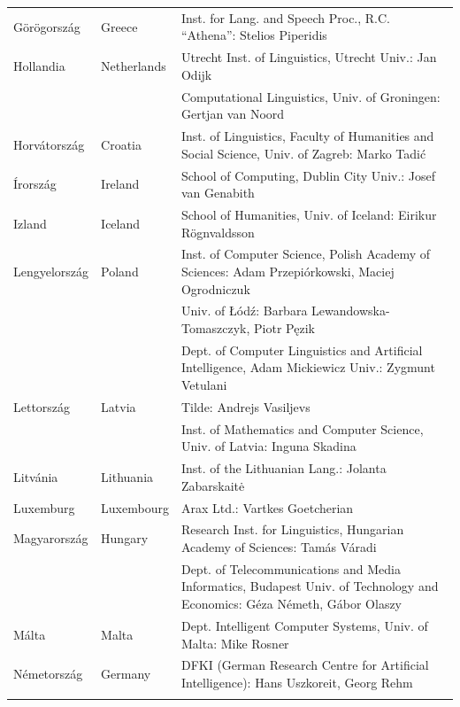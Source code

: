 \begin{longtable}{llp{105mm}}
  Görögország & \textcolor{grey1}{Greece} & Inst. for Lang. and Speech Proc., R.C. “Athena”: Stelios Piperidis\\ \addlinespace
   Hollandia & \textcolor{grey1}{Netherlands} & Utrecht Inst. of Linguistics, Utrecht Univ.: Jan Odijk\\ \addlinespace 
  & & Computational Linguistics, Univ. of Groningen: Gertjan van Noord\\ \addlinespace
   Horvátország & \textcolor{grey1}{Croatia} & Inst. of Linguistics, Faculty of Humanities and Social Science, Univ. of Zagreb: Marko Tadić \\ \addlinespace
    Írország & \textcolor{grey1}{Ireland} & School of Computing, Dublin City Univ.: Josef van Genabith\\ \addlinespace
  Izland & \textcolor{grey1}{Iceland} & School of Humanities, Univ. of Iceland: Eirikur Rögnvaldsson\\ \addlinespace
  Lengyelország & \textcolor{grey1}{Poland} & Inst. of Computer Science, Polish Academy of Sciences: Adam Przepiórkowski, Maciej Ogrodniczuk \\ \addlinespace
  & & Univ. of Łódź: Barbara Lewandowska-Tomaszczyk, Piotr Pęzik\\ \addlinespace
  & & Dept. of Computer Linguistics and Artificial Intelligence, Adam Mickiewicz Univ.: Zygmunt Vetulani \\ \addlinespace
  Lettország & \textcolor{grey1}{Latvia} & Tilde: Andrejs Vasiljevs\\ \addlinespace 
  & & Inst. of Mathematics and Computer Science, Univ. of Latvia: Inguna Skadina\\ \addlinespace
  Litvánia & \textcolor{grey1}{Lithuania} & Inst. of the Lithuanian Lang.: Jolanta Zabarskaitė\\ \addlinespace
  Luxemburg & \textcolor{grey1}{Luxembourg} & Arax Ltd.: Vartkes Goetcherian\\ \addlinespace
  Magyarország & \textcolor{grey1}{Hungary} & Research Inst. for Linguistics, Hungarian Academy of Sciences: Tamás Váradi\\  \addlinespace
  & & Dept. of Telecommunications and Media Informatics, Budapest Univ. of Technology and Economics: Géza Németh, Gábor Olaszy\\ \addlinespace
  Málta & \textcolor{grey1}{Malta} & Dept. Intelligent Computer Systems, Univ. of Malta: Mike Rosner\\ \addlinespace
  Németország & \textcolor{grey1}{Germany} & DFKI (German Research Centre for Artificial Intelligence): Hans Uszkoreit, Georg Rehm\\ \addlinespace

\end{longtable}
